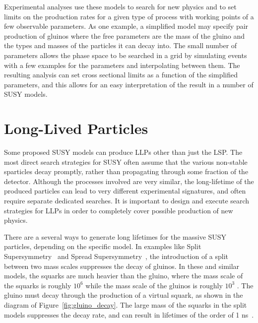 Experimental analyses use these models to search for new physics and to set limits on the production rates for a given type of process with working points of a few observable parameters.
As one example, a simplified model may specify pair production of gluinos where the free parameters are the mass of the gluino and the types and masses of the particles it can decay into.
The small number of parameters allows the phase space to be searched in a grid by simulating events with a few examples for the parameters and interpolating between them.
The resulting analysis can set cross sectional limits as a function of the simplified parameters, and this allows for an easy interpretation of the result in a number of \ac{SUSY} models.

\section{Long-Lived Particles}
\label{sec:llp_theory}

Some proposed \ac{SUSY} models can produce \acp{LLP} other than just the \ac{LSP}.
The most direct search strategies for \ac{SUSY} often assume that the various non-stable sparticles decay promptly, rather than propagating through some fraction of the detector.
Although the processes involved are very similar, the long-lifetime of the produced particles can lead to very different experimental signatures, and often require separate dedicated searches.
It is important to design and execute search strategies for \acp{LLP} in order to completely cover possible production of new physics. 

There are a several ways to generate long lifetimes for the massive \ac{SUSY} particles, depending on the specific model.
In examples like Split Supersymmetry~\cite{split1,split2} and Spread Supersymmetry~\cite{spreadsusy}, the introduction of a split between two mass scales suppresses the decay of gluinos.
In these and similar models, the squarks are much heavier than the gluino, where the mass scale of the squarks is roughly $10^6$ \GeV while the mass scale of the gluinos is roughly $10^3$ \GeV.
The gluino must decay through the production of a virtual squark, as shown in the diagram of Figure~\ref{fig:gluino_decay}.
The large mass of the squarks in the split models suppresses the decay rate, and can result in lifetimes of the order of 1 ns~\cite{spreadsusy}.

